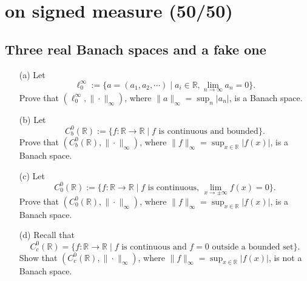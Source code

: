 \documentclass[lang=cn,11pt]{elegantbook}
\begin{document}
\chapter{on signed measure (50/50)}

\section{Three real Banach spaces and a fake one}
  \begin{itemize}
  \item[(a)]  Let 
    \[
      \ell^\infty_0 := \{ a= (a_1, a_2, \cdots)\mid a_i\in \mathbb{R}, \lim_{n\to \infty} a_n =0\}.
    \]Prove that $(\ell^\infty_0, \| \cdot\|_\infty)$, where $\|a\|_\infty=\sup_n|a_n|$, is a Banach space.
  \item[(b)]   Let
    \[
      C^0_b(\mathbb{R}) := \{ f: \mathbb{R} \to \mathbb{R} \mid \text{$f$ is continuous and bounded}\}.
    \]
    Prove that $(C^0_b(\mathbb{R}), \| \cdot\|_\infty)$, where $\|f\|_\infty=\sup_{x\in \mathbb{R}}|f(x)|$, is a Banach space.
  \item[(c)]   Let
    \[
      C^0_0(\mathbb{R}) := \{ f: \mathbb{R}\to  \mathbb{R} \mid \text{$f$ is continuous, $\lim_{x\to\pm\infty} f(x) =0$}\}.
    \]
    Prove that $(C^0_0(\mathbb{R}), \| \cdot\|_\infty)$, where $\|f\|_\infty=\sup_{x\in\mathbb{R}}|f(x)|$, is a Banach space.
    \item[(d)] Recall that 
    \[
      C^0_c(\mathbb{R}) = \{ f\colon \mathbb{R} \to \mathbb{R} \mid \text{$f$ is continuous and $f=0$ outside a bounded set}\}.
    \]
    Show that $(C^0_c(\mathbb{R}), \| \cdot\|_\infty)$, where $\|f\|_\infty=\sup_{x\in \mathbb{R}}|f(x)|$, is not a Banach space.
\end{itemize}
\end{document}
